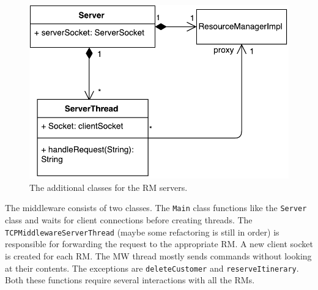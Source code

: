 \documentclass{article}
\begin{document}
\begin{figure}[h]
\centering
\includegraphics[scale=0.6]{figures/server-class.pdf}
\caption{The additional classes for the RM servers.}
\label{f:server-class}
\end{figure}

The middleware consists of two classes. The \texttt{Main} class functions like the \texttt{Server} class and waits for client connections before creating threads.
The \texttt{TCPMiddlewareServerThread} (maybe some refactoring is still in order) is responsible for forwarding the request to the appropriate RM. A new client socket is created for each RM. The MW thread mostly sends commands without looking at their contents. The exceptions are \texttt{deleteCustomer} and \texttt{reserveItinerary}. Both these functions require several interactions with all the RMs.
\end{document}
